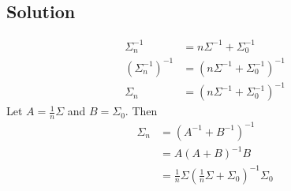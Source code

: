 \documentclass{IEEEtran}
\begin{document}
\subsection{Solution}
\begin{align*}
    \Sigma_n^{-1} &= n\Sigma^{-1} + \Sigma_0^{-1} \\
    \left(\Sigma_n^{-1}\right)^{-1} &= \left(n\Sigma^{-1} + \Sigma_0^{-1}\right)^{-1} \\
    \Sigma_n &= \left(n\Sigma^{-1} + \Sigma_0^{-1}\right)^{-1}
\end{align*}
Let \(A = \frac{1}{n}\Sigma\) and \(B = \Sigma_0\). Then
\begin{align*}
    \Sigma_n &= \left(A^{-1} + B^{-1}\right)^{-1} \\
    &= A \left(A + B\right)^{-1} B \\
    &= \frac{1}{n} \Sigma \left(\frac{1}{n} \Sigma + \Sigma_0\right)^{-1} \Sigma_0
\end{align*}
\end{document}
